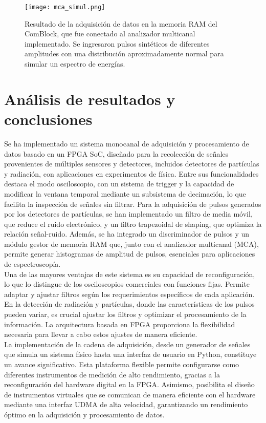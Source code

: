 \documentclass{report}
\begin{document}
\begin{figure}[H]
    \centering
    \texttt{[image: mca\_simul.png]}
    \caption{Resultado de la adquisición de datos en la memoria RAM del ComBlock, que fue conectado al analizador multicanal implementado. Se ingresaron pulsos sintéticos de diferentes amplitudes con una distribución aproximadamente normal para simular un espectro de energías.}
    \label{fig:mca_simul}
\end{figure}

\newpage 

\section{Análisis de resultados y conclusiones}

\noindent Se ha implementado un sistema monocanal de adquisición y procesamiento de datos basado en un FPGA SoC, diseñado para la recolección de señales provenientes de múltiples sensores y detectores, incluidos detectores de partículas y radiación, con aplicaciones en experimentos de física. Entre sus funcionalidades destaca el modo osciloscopio, con un sistema de trigger y la capacidad de modificar la ventana temporal mediante un subsistema de decimación, lo que facilita la inspección de señales sin filtrar. Para la adquisición de pulsos generados por los detectores de partículas, se han implementado un filtro de media móvil, que reduce el ruido electrónico, y un filtro trapezoidal de shaping, que optimiza la relación señal-ruido. Además, se ha integrado un discriminador de pulsos y un módulo gestor de memoria RAM que, junto con el analizador multicanal (MCA), permite generar histogramas de amplitud de pulsos, esenciales para aplicaciones de espectroscopía.\\

\noindent Una de las mayores ventajas de este sistema es su capacidad de reconfiguración, lo que lo distingue de los osciloscopios comerciales con funciones fijas. Permite adaptar y ajustar filtros según los requerimientos específicos de cada aplicación. En la detección de radiación y partículas, donde las características de los pulsos pueden variar, es crucial ajustar los filtros y optimizar el procesamiento de la información. La arquitectura basada en FPGA proporciona la flexibilidad necesaria para llevar a cabo estos ajustes de manera eficiente.\\

\noindent La implementación de la cadena de adquisición, desde un generador de señales que simula un sistema físico hasta una interfaz de usuario en Python, constituye un avance significativo. Esta plataforma flexible permite configurarse como diferentes instrumentos de medición de alto rendimiento, gracias a la reconfiguración del hardware digital en la FPGA. Asimismo, posibilita el diseño de instrumentos virtuales que se comunican de manera eficiente con el hardware mediante una interfaz UDMA de alta velocidad, garantizando un rendimiento óptimo en la adquisición y procesamiento de datos.\\
\end{document}
